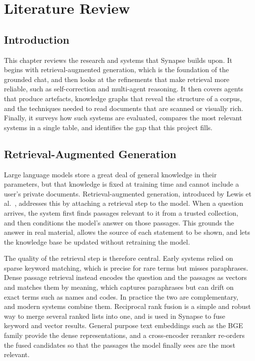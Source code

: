 \chapter{Literature Review}
\label{ch:literature}

\section{Introduction}

This chapter reviews the research and systems that Synapse builds upon. It begins
with retrieval-augmented generation, which is the foundation of the grounded
chat, and then looks at the refinements that make retrieval more reliable, such
as self-correction and multi-agent reasoning. It then covers agents that produce
artefacts, knowledge graphs that reveal the structure of a corpus, and the
techniques needed to read documents that are scanned or visually rich. Finally,
it surveys how such systems are evaluated, compares the most relevant systems in
a single table, and identifies the gap that this project fills.

\section{Retrieval-Augmented Generation}

Large language models store a great deal of general knowledge in their
parameters, but that knowledge is fixed at training time and cannot include a
user's private documents. Retrieval-augmented generation, introduced by Lewis et
al.\ \cite{lewis2020rag}, addresses this by attaching a retrieval step to the
model. When a question arrives, the system first finds passages relevant to it
from a trusted collection, and then conditions the model's answer on those
passages. This grounds the answer in real material, allows the source of each
statement to be shown, and lets the knowledge base be updated without retraining
the model.

The quality of the retrieval step is therefore central. Early systems relied on
sparse keyword matching, which is precise for rare terms but misses paraphrases.
Dense passage retrieval \cite{karpukhin2020dpr} instead encodes the question and
the passages as vectors and matches them by meaning, which captures paraphrases
but can drift on exact terms such as names and codes. In practice the two are
complementary, and modern systems combine them. Reciprocal rank fusion
\cite{cormack2009rrf} is a simple and robust way to merge several ranked lists
into one, and is used in Synapse to fuse keyword and vector results. General
purpose text embeddings such as the BGE family \cite{xiao2024cpack} provide the
dense representations, and a cross-encoder reranker re-orders the fused
candidates so that the passages the model finally sees are the most relevant.


